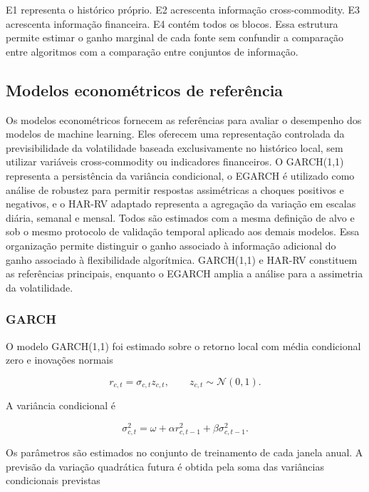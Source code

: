 \documentclass[a4paper,fleqn]{cas-sc}
\begin{document}
E1 representa o histórico próprio. E2 acrescenta informação cross-commodity. E3 acrescenta informação financeira. E4 contém todos os blocos. Essa estrutura permite estimar o ganho marginal de cada fonte sem confundir a comparação entre algoritmos com a comparação entre conjuntos de informação.

\subsection{Modelos econométricos de referência}
\label{subsec:econometric_models}

Os modelos econométricos fornecem as referências para avaliar o desempenho dos modelos de machine learning. Eles oferecem uma representação controlada da previsibilidade da volatilidade baseada exclusivamente no histórico local, sem utilizar variáveis cross-commodity ou indicadores financeiros. O GARCH(1,1) representa a persistência da variância condicional, o EGARCH é utilizado como análise de robustez para permitir respostas assimétricas a choques positivos e negativos, e o HAR-RV adaptado representa a agregação da variação em escalas diária, semanal e mensal. Todos são estimados com a mesma definição de alvo e sob o mesmo protocolo de validação temporal aplicado aos demais modelos. Essa organização permite distinguir o ganho associado à informação adicional do ganho associado à flexibilidade algorítmica. GARCH(1,1) e HAR-RV constituem as referências principais, enquanto o EGARCH amplia a análise para a assimetria da volatilidade.

\subsubsection{GARCH}

O modelo GARCH(1,1) foi estimado sobre o retorno local com média condicional zero e inovações normais \citep{Bollerslev1986GARCH}

\begin{equation}
r_{c,t}=\sigma_{c,t}z_{c,t},
\qquad
z_{c,t}\sim\mathcal{N}(0,1).
\label{eq:garch_return}
\end{equation}

A variância condicional é

\begin{equation}
\sigma_{c,t}^{2}
=
\omega
+\alpha r_{c,t-1}^{2}
+\beta\sigma_{c,t-1}^{2}.
\label{eq:garch}
\end{equation}

Os parâmetros são estimados no conjunto de treinamento de cada janela anual. A previsão da variação quadrática futura é obtida pela soma das variâncias condicionais previstas
\end{document}
